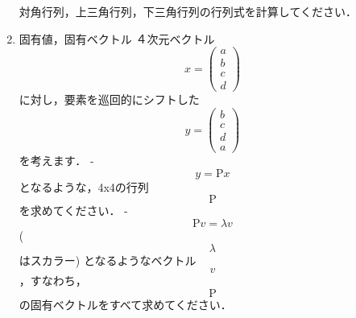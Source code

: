 \begin{enumerate}[label=問\arabic*.]
    対角行列，上三角行列，下三角行列の行列式を計算してください．

  \item 固有値，固有ベクトル
    ４次元ベクトル $$x = \left( \begin{array}{r} a \\ b \\ c \\ d \end{array} \right)$$ に対し，要素を巡回的にシフトした $$y = \left( \begin{array}{r} b \\ c \\ d \\ a \end{array} \right)$$を考えます．
    - $$y = \mathrm{P}x$$ となるような，4x4の行列 $$\mathrm{P}$$ を求めてください．
    - $$\mathrm{P}v = \lambda v$$ ($$\lambda$$はスカラー) となるようなベクトル $$v$$，すなわち，$$\mathrm{P}$$ の固有ベクトルをすべて求めてください．
  
\end{enumerate}